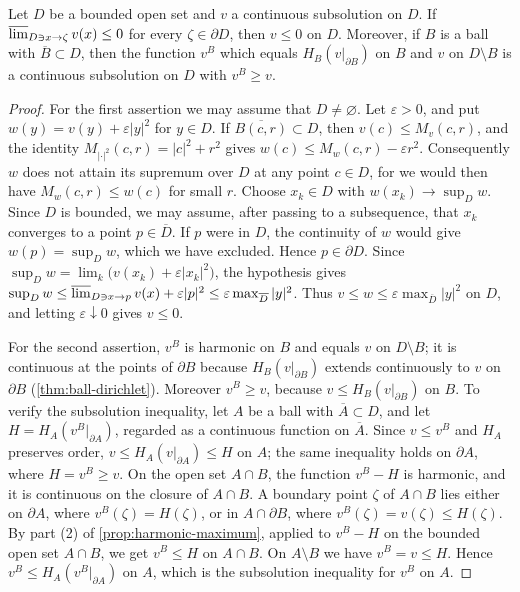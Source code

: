\begin{lemma}\label{lem:subsolution-comparison}
Let $D$ be a bounded open set and $v$ a continuous subsolution on $D$. If $\varlimsup_{D\ni x\to\zeta}v(x)\leq0$ for every $\zeta\in\partial D$, then $v\leq0$ on $D$. Moreover, if $B$ is a ball with $\overline B\subset D$, then the function $v^B$ which equals $H_B(v|_{\partial B})$ on $B$ and $v$ on $D\setminus B$ is a continuous subsolution on $D$ with $v^B\geq v$.
\end{lemma}
\begin{proof}
For the first assertion we may assume that $D\neq\varnothing$. Let $\varepsilon>0$, and put $w(y)=v(y)+\varepsilon|y|^2$ for $y\in D$. If $\overline{B(c,r)}\subset D$, then $v(c)\leq M_v(c,r)$, and the identity $M_{|\cdot|^2}(c,r)=|c|^2+r^2$ gives $w(c)\leq M_w(c,r)-\varepsilon r^2$. Consequently $w$ does not attain its supremum over $D$ at any point $c\in D$, for we would then have $M_w(c,r)\leq w(c)$ for small $r$. Choose $x_k\in D$ with $w(x_k)\to\sup_Dw$. Since $D$ is bounded, we may assume, after passing to a subsequence, that $x_k$ converges to a point $p\in\overline D$. If $p$ were in $D$, the continuity of $w$ would give $w(p)=\sup_Dw$, which we have excluded. Hence $p\in\partial D$. Since $\sup_Dw=\lim_k\bigl(v(x_k)+\varepsilon|x_k|^2\bigr)$, the hypothesis gives $\sup_Dw\leq\varlimsup_{D\ni x\to p}v(x)+\varepsilon|p|^2\leq\varepsilon\max_{\overline D}|y|^2$. Thus $v\leq w\leq\varepsilon\max_{\overline D}|y|^2$ on $D$, and letting $\varepsilon\downarrow0$ gives $v\leq0$.

For the second assertion, $v^B$ is harmonic on $B$ and equals $v$ on $D\setminus B$; it is continuous at the points of $\partial B$ because $H_B(v|_{\partial B})$ extends continuously to $v$ on $\partial B$ (\cref{thm:ball-dirichlet}). Moreover $v^B\geq v$, because $v\leq H_B(v|_{\partial B})$ on $B$. To verify the subsolution inequality, let $A$ be a ball with $\overline A\subset D$, and let $H=H_A(v^B|_{\partial A})$, regarded as a continuous function on $\overline A$. Since $v\leq v^B$ and $H_A$ preserves order, $v\leq H_A(v|_{\partial A})\leq H$ on $A$; the same inequality holds on $\partial A$, where $H=v^B\geq v$. On the open set $A\cap B$, the function $v^B-H$ is harmonic, and it is continuous on the closure of $A\cap B$. A boundary point $\zeta$ of $A\cap B$ lies either on $\partial A$, where $v^B(\zeta)=H(\zeta)$, or in $A\cap\partial B$, where $v^B(\zeta)=v(\zeta)\leq H(\zeta)$. By part (2) of \cref{prop:harmonic-maximum}, applied to $v^B-H$ on the bounded open set $A\cap B$, we get $v^B\leq H$ on $A\cap B$. On $A\setminus B$ we have $v^B=v\leq H$. Hence $v^B\leq H_A(v^B|_{\partial A})$ on $A$, which is the subsolution inequality for $v^B$ on $A$.
\end{proof}


